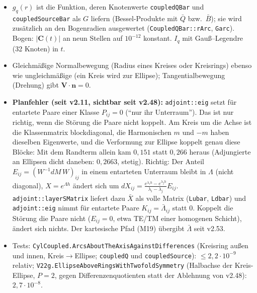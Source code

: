 \begin{itemize}[nosep]
  \item $g_q(r)$ ist die Funktion, deren Knotenwerte \verb|coupledQBar| und \verb|coupledSourceBar| als $G$ liefern
        (Bessel-Produkte mit $\bar Q$ bzw.\ $\bar B$); sie wird zusätzlich an den Bogenradien ausgewertet
        (\verb|CoupledQBar::rArc|, \verb|Garc|). Bogen: $|\mathbf C(t)|$ an neun Stellen auf $10^{-12}$ konstant. $I_q$ mit
        Gauß--Legendre (32 Knoten) in $t$.
  \item Gleichmäßige Normalbewegung (Radius eines Kreises oder Kreisrings) ebenso wie ungleichmäßige (ein Kreis wird zur
        Ellipse); Tangentialbewegung (Drehung) gibt $\mathbf V\cdot\mathbf n=0$.
  \item \textbf{Planfehler (seit v2.11, sichtbar seit v2.48):} \verb|adjoint::eig| setzt für entartete Paare einer Klasse
        $P_{ij}=0$ (\enquote{nur ihr Unterraum}). Das ist nur richtig, wenn die Störung die Paare nicht koppelt. Am Kreis um die
        Achse ist die Klassenmatrix blockdiagonal, die Harmonischen $m$ und $-m$ haben dieselben Eigenwerte, und die
        Verformung zur Ellipse koppelt genau diese Blöcke: Mit dem Randterm allein kam $0{,}151$ statt $0{,}266$ heraus
        (Adjungierte an Ellipsen dicht daneben: $0{,}2663$, stetig). Richtig: Der Anteil $E_{ij}=(W^{-1}dM\,W)_{ij}$ in einem
        entarteten Unterraum bleibt in $\Lambda$ (nicht diagonal), $X=e^{\Lambda h}$ ändert sich um
        $dX_{ij}=\frac{e^{\lambda_ih}-e^{\lambda_jh}}{\lambda_i-\lambda_j}E_{ij}$. \verb|adjoint::layerSMatrix| liefert dazu
        $\bar X$ als volle Matrix (\verb|Lubar|, \verb|Ldbar|) und \verb|adjoint::eig| nimmt für entartete Paare
        $K_{ij}=\bar\Lambda_{ij}$ statt $0$. Koppelt die Störung die Paare nicht ($E_{ij}=0$, etwa TE/TM einer homogenen
        Schicht), ändert sich nichts. Der kartesische Pfad (M19) übergibt $\bar\Lambda$ seit v2.53.
  \item Tests: \verb|CylCoupled.ArcsAboutTheAxisAgainstDifferences| (Kreisring außen und innen, Kreis$\to$Ellipse;
        \verb|coupledQ| und \verb|coupledSource|): $\le2{,}2\cdot10^{-9}$ relativ; \verb|V22g.EllipseAboveRingsWithTwofoldSymmetry|
        (Halbachse der Kreis-Ellipse, $P=2$, gegen Differenzenquotienten statt der Ablehnung von v2.48): $2{,}7\cdot10^{-8}$.
\end{itemize}

